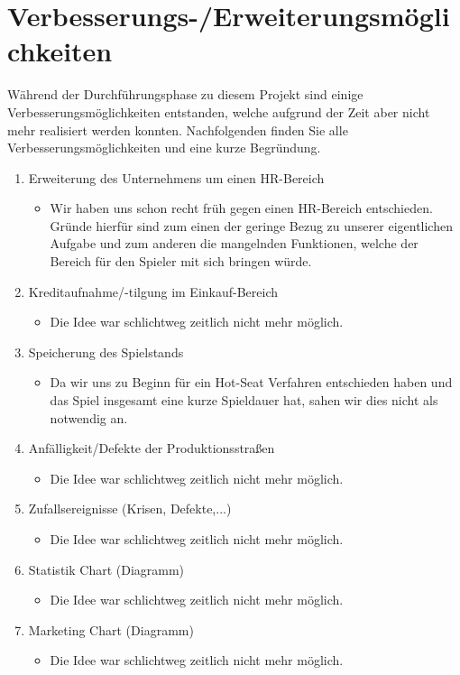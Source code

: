 \clearpage
\chapter{Verbesserungs-/Erweiterungsmöglichkeiten}
Während der Durchführungsphase zu diesem Projekt sind einige Verbesserungsmöglichkeiten entstanden, welche aufgrund der Zeit aber nicht mehr realisiert werden konnten. Nachfolgenden finden Sie alle Verbesserungsmöglichkeiten und eine kurze Begründung.
\begin{enumerate}
	\item Erweiterung des Unternehmens um einen HR-Bereich
\begin{itemize}
	\item Wir haben uns schon recht früh gegen einen HR-Bereich entschieden. Gründe hierfür sind zum einen der geringe Bezug zu unserer eigentlichen Aufgabe und zum anderen die mangelnden Funktionen, welche der Bereich für den Spieler mit sich bringen würde. 	
\end{itemize} 
	\item Kreditaufnahme/-tilgung im Einkauf-Bereich
\begin{itemize}
	\item Die Idee war schlichtweg zeitlich nicht mehr möglich.
\end{itemize} 
	\item Speicherung des Spielstands
\begin{itemize}
	\item Da wir uns zu Beginn für ein Hot-Seat Verfahren entschieden haben und das Spiel insgesamt eine kurze Spieldauer hat, sahen wir dies nicht als notwendig an.
\end{itemize} 
	\item Anfälligkeit/Defekte der Produktionsstraßen
\begin{itemize}
	\item Die Idee war schlichtweg zeitlich nicht mehr möglich.
\end{itemize} 
	\item Zufallsereignisse (Krisen, Defekte,...)
\begin{itemize}
	\item Die Idee war schlichtweg zeitlich nicht mehr möglich.
\end{itemize} 
	\item Statistik Chart (Diagramm) 
\begin{itemize}
	\item Die Idee war schlichtweg zeitlich nicht mehr möglich.
\end{itemize} 	
	\item Marketing Chart (Diagramm) 
\begin{itemize}
	\item Die Idee war schlichtweg zeitlich nicht mehr möglich.
\end{itemize}
\end{enumerate}




